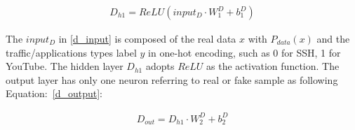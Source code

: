 \documentclass[conference]{IEEEtran}
\begin{document}
\begin{equation}
\begin{split}
\label{d_input}
D_{h1}=ReLU(input_D\cdot W^D_1+b^D_1)
\end{split}
\end{equation}

The $input_D$ in  \eqref{d_input} is composed of the real data $x$ with $P_{data}(x)$ and the traffic/applications types label $y$ in one-hot encoding, such as 0 for SSH, 1 for YouTube. The hidden layer $D_{h1}$ adopts $ReLU$ as the activation function. The output layer has only one neuron referring to real or fake sample as following Equation:~\ref{d_output}:

\begin{equation}
\begin{split}
\label{d_output}
D_{out}=D_{h1}\cdot W^D_2+b^D_2
\end{split}
\end{equation}
\end{document}
